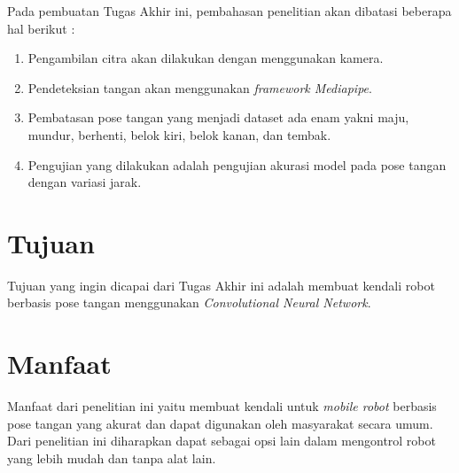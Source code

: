 Pada pembuatan Tugas Akhir ini, pembahasan penelitian akan dibatasi beberapa hal berikut :
\begin{enumerate}
	\item Pengambilan citra akan dilakukan dengan menggunakan kamera.
	\item Pendeteksian tangan akan menggunakan \textit{framework Mediapipe}.
	\item Pembatasan pose tangan yang menjadi dataset ada enam yakni maju, mundur, berhenti, belok kiri, belok kanan, dan tembak.
	\item Pengujian yang dilakukan adalah pengujian akurasi model pada pose tangan dengan variasi jarak.
\end{enumerate}

\section{Tujuan}

Tujuan yang ingin dicapai dari Tugas Akhir ini adalah membuat kendali robot berbasis pose tangan menggunakan \textit{Convolutional Neural Network}.


\section{Manfaat}
Manfaat dari penelitian ini yaitu membuat kendali untuk \textit{mobile robot} berbasis pose tangan yang akurat dan dapat digunakan oleh masyarakat secara umum. Dari penelitian ini diharapkan dapat sebagai opsi lain dalam mengontrol robot yang lebih mudah dan tanpa alat lain.
